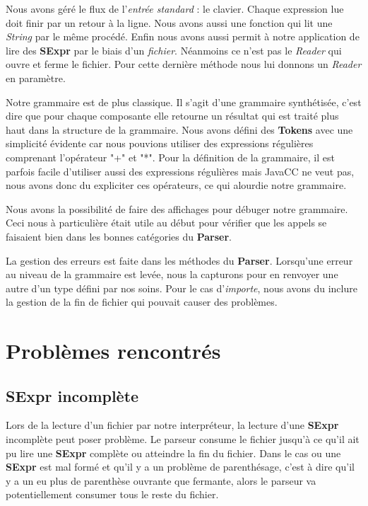 \documentclass[a4paper, 11pt]{article}
\numberwithin{equation}{section}
\theoremstyle{definition}
\begin{document}
Nous avons géré le flux de l'\textit{entrée standard} : le clavier. Chaque expression lue doit finir par un retour à la ligne. Nous avons aussi une fonction qui lit une \textit{String} par le même procédé. Enfin nous avons aussi permit à notre application de lire des {\bfseries SExpr} par le biais d'un \textit{fichier}. Néanmoins ce n'est pas le \textit{Reader} qui ouvre et ferme le fichier. Pour cette dernière méthode nous lui donnons un \textit{Reader} en paramètre.

Notre grammaire est de plus classique. Il s'agit d'une grammaire synthétisée, c'est dire que pour chaque composante elle retourne un résultat qui est traité plus haut dans la structure de la grammaire. Nous avons défini des {\bfseries Tokens} avec une simplicité évidente car nous pouvions utiliser des expressions régulières comprenant l'opérateur "+" et "*". Pour la définition de la grammaire, il est parfois facile d'utiliser aussi des expressions régulières mais JavaCC ne veut pas, nous avons donc du expliciter ces opérateurs, ce qui alourdie notre grammaire. 

Nous avons la possibilité de faire des affichages pour débuger notre grammaire. Ceci nous à particulière était utile au début pour vérifier que les appels se faisaient bien dans les bonnes catégories du {\bfseries Parser}.

La gestion des erreurs est faite dans les méthodes du {\bfseries Parser}. Lorsqu'une erreur au niveau de la grammaire est levée, nous la capturons pour en renvoyer une autre d'un type défini par nos soins. Pour le cas d'\textit{importe}, nous avons du inclure la gestion de la fin de fichier qui pouvait causer des problèmes.

\section{Problèmes rencontrés}

\subsection{SExpr incomplète}

Lors de la lecture d'un fichier par notre interpréteur, la lecture d'une {\bfseries SExpr} incomplète peut poser problème. Le parseur consume le fichier jusqu’à ce qu'il ait pu lire une {\bfseries SExpr} complète ou atteindre la fin du fichier. Dans le cas ou une {\bfseries SExpr} est mal formé et qu'il y a un problème de parenthésage, c'est à dire qu'il y a un eu plus de parenthèse ouvrante que fermante, alors le parseur va potentiellement consumer tous le reste du fichier.
\end{document}
